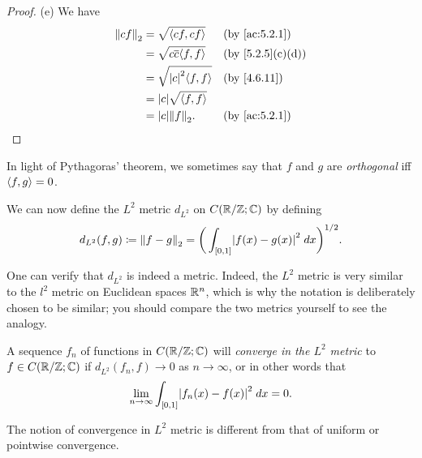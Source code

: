 \begin{proof}{(e)}
  We have
  \begin{align*}
    \norm*{cf}_2 & = \sqrt{\inner*{cf, cf}}              &  & \by{ac:5.2.1}                  \\
                 & = \sqrt{c \overline{c} \inner*{f, f}} &  & \text{(by \cref{5.2.5}(c)(d))} \\
                 & = \sqrt{\abs{c}^2 \inner*{f, f}}      &  & \by{4.6.11}                    \\
                 & = \abs{c} \sqrt{\inner*{f, f}}                                            \\
                 & = \abs{c} \norm*{f}_2.                &  & \by{ac:5.2.1}
  \end{align*}
\end{proof}

\begin{note}
  In light of Pythagoras' theorem, we sometimes say that \(f\) and \(g\) are \emph{orthogonal} iff \(\inner*{f, g} = 0\).
\end{note}

\begin{ac}\label{ac:5.2.2}
  We can now define the \(L^2\) metric \(d_{L^2}\) on \(C(\R / \Z ; \C)\) by defining
  \[
    d_{L^2}(f, g) \coloneqq \norm*{f - g}_2 = \bigg(\int_{[0, 1]} \abs{f(x) - g(x)}^2 \; dx\bigg)^{1 / 2}.
  \]
\end{ac}

\begin{rmk}\label{5.2.8}
  One can verify that \(d_{L^2}\) is indeed a metric.
  Indeed, the \(L^2\) metric is very similar to the \(l^2\) metric on Euclidean spaces \(\R^n\), which is why the notation is deliberately chosen to be similar;
  you should compare the two metrics yourself to see the analogy.
\end{rmk}

\begin{note}
  A sequence \(f_n\) of functions in \(C(\R / \Z ; \C)\) will \emph{converge in the \(L^2\) metric} to \(f \in C(\R / \Z ; \C)\) if \(d_{L^2}(f_n, f) \to 0\) as \(n \to \infty\), or in other words that
  \[
    \lim_{n \to \infty} \int_{[0, 1]} \abs{f_n(x) - f(x)}^2 \; dx = 0.
  \]
\end{note}

\begin{rmk}\label{5.2.9}
  The notion of convergence in \(L^2\) metric is different from that of uniform or pointwise convergence.
\end{rmk}

